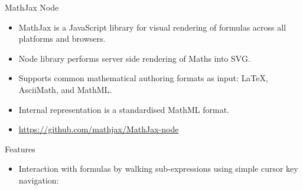 \documentclass[final,hyperref={pdfpagelabels=false}]{beamer}
\begin{document}
\begin{frame}{}
\begin{columns}[t]
\begin{column}{.32\linewidth}
      \begin{block}{\Large MathJax Node}
        \begin{itemize}
        \item MathJax is a JavaScript library for visual rendering of formulas
          across all platforms and browsers.
        \item Node library performs server side rendering of Maths into
          SVG.
        \item Supports common mathematical authoring formats as input: {\LaTeX},
          AsciiMath, and MathML.
        \item Internal representation is a standardised MathML format.
        \item \textcolor{red}{\url{https://github.com/mathjax/MathJax-node}}
        \end{itemize}
      \end{block}
      \begin{block}{\Large Features}
        \begin{itemize}
        \item Interaction with formulas by walking sub-expressions using simple
          cursor key navigation:
          

\end{itemize}
\end{block}
\end{column}
\end{columns}
\end{frame}
\end{document}
